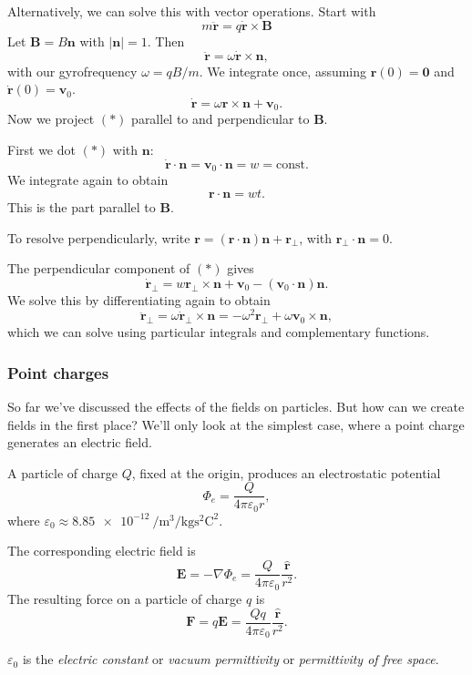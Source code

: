 \documentclass[a4paper]{article}
\begin{document}
Alternatively, we can solve this with vector operations. Start with
\[
  m\ddot{\mathbf{r}} = q\dot{\mathbf{r}}\times \mathbf{B}
\]
Let $\mathbf{B} = B\mathbf{n}$ with $|\mathbf{n}| = 1$. Then
\[
  \ddot{\mathbf{r}} = \omega \dot{\mathbf{r}}\times \mathbf{n},
\]
with our gyrofrequency $\omega = qB/m$. We integrate once, assuming $\mathbf{r}(0) = \mathbf{0}$ and $\dot{\mathbf{r}}(0) = \mathbf{v}_0$.
\[
  \dot{\mathbf{r}} = \omega \mathbf{r} \times \mathbf{n} + \mathbf{v}_0. \tag{$*$}
\]
Now we project $(*)$ parallel to and perpendicular to $\mathbf{B}$.

First we dot $(*)$ with $\mathbf{n}$:
\[
  \dot{\mathbf{r}}\cdot \mathbf{n} = \mathbf{v}_0\cdot \mathbf{n} = w = \text{const}.
\]
We integrate again to obtain
\[
  \mathbf{r}\cdot \mathbf{n} = wt.
\]
This is the part parallel to $\mathbf{B}$.

To resolve perpendicularly, write $\mathbf{r} = (\mathbf{r}\cdot \mathbf{n})\mathbf{n} + \mathbf{r}_\bot$, with $\mathbf{r}_\bot \cdot \mathbf{n} = 0$.

The perpendicular component of $(*)$ gives
\[
  \dot{\mathbf{r}}_\bot = w\mathbf{r}_\bot \times \mathbf{n} + \mathbf{v}_0 - (\mathbf{v}_0\cdot \mathbf{n})\mathbf{n}.
\]
We solve this by differentiating again to obtain
\[
  \ddot{\mathbf{r}}_\bot = \omega \dot{\mathbf{r}}_\bot \times \mathbf{n} = -\omega^2 \mathbf{r}_\bot + \omega \mathbf{v}_0 \times \mathbf{n},
\]
which we can solve using particular integrals and complementary functions.

\subsubsection*{Point charges}
So far we've discussed the effects of the fields on particles. But how can we create fields in the first place? We'll only look at the simplest case, where a point charge generates an electric field.

\begin{law}
  A particle of charge $Q$, fixed at the origin, produces an electrostatic potential
  \[
    \Phi_e = \frac{Q}{4\pi\varepsilon_0 r},
  \]
  where $\varepsilon_0 \approx \SI{8.85e-12}{\per\meter\cubed\per\kilogram\second\squared\coulomb\squared}$.

  The corresponding electric field is
  \[
    \mathbf{E} = -\nabla \Phi_e = \frac{Q}{4\pi\varepsilon_0} \frac{\hat{\mathbf{r}}}{r^2}.
  \]
  The resulting force on a particle of charge $q$ is
  \[
    \mathbf{F} = q\mathbf{E} = \frac{Qq}{4\pi\varepsilon_0}\frac{\hat{\mathbf{r}}}{r^2}.
  \]
\end{law}
\begin{defi}
  $\varepsilon_0$ is the \emph{electric constant} or \emph{vacuum permittivity} or \emph{permittivity of free space}.
\end{defi}
\end{document}

